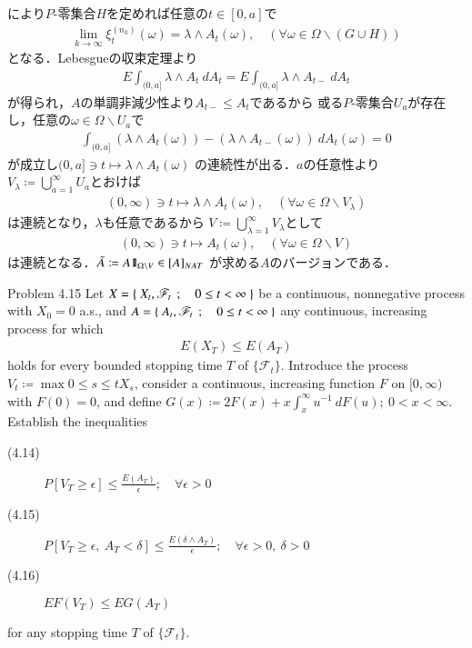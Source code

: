 \begin{prf}
\begin{description}
				により$P$-零集合$H$を定めれば任意の$t \in [0,a]$で
				\begin{align}
					\lim_{k \to \infty} \xi^{(n_k)}_t(\omega) = \lambda \wedge A_t(\omega),
					\quad (\forall \omega \in \Omega \backslash (G \cup H))
				\end{align}
				となる．Lebesgueの収束定理より
				\begin{align}
					E\int_{(0,a]} \lambda \wedge A_t\ dA_t
					= E\int_{(0,a]} \lambda \wedge A_{t-}\ dA_t
				\end{align}
				が得られ，$A$の単調非減少性より$A_{t-} \leq A_t$であるから
				或る$P$-零集合$U_a$が存在し，任意の$\omega \in \Omega \backslash U_a$で
				\begin{align}
					\int_{(0,a]} (\lambda \wedge A_t(\omega)) 
					- (\lambda \wedge A_{t-}(\omega))\ dA_t(\omega) = 0
				\end{align}
				が成立し$(0,a] \ni t \longmapsto \lambda \wedge A_t(\omega)$
				の連続性が出る．$a$の任意性より
				$V_\lambda \coloneqq \bigcup_{a=1}^\infty U_a$とおけば
				\begin{align}
					(0,\infty) \ni t \longmapsto \lambda \wedge A_t(\omega),
					 \quad (\forall \omega \in \Omega \backslash V_\lambda)
				\end{align}
				は連続となり，$\lambda$も任意であるから
				$V \coloneqq \bigcup_{\lambda=1}^\infty V_\lambda$として
				\begin{align}
					(0,\infty) \ni t \longmapsto A_t(\omega),
					\quad (\forall \omega \in \Omega \backslash V)
				\end{align}
				は連続となる．$\tilde{A} \coloneqq A \mbox{1}\hspace{-0.25em}\mbox{l}_{\Omega \backslash V} \in [A]_{NAT}$
				が求める$A$のバージョンである．
				\QED
		\end{description}
	\end{prf}
	
	\begin{itembox}[l]{Problem 4.15}
		Let $X = \left\{\ X_t,\mathscr{F}_t\ \, ; \quad 0 \leq t < \infty\ \right\}$ be a continuous, nonnegative process
		with $X_0 = 0$ a.s., and $A = \left\{\ A_t,\mathscr{F}_t\ \, ; \quad 0 \leq t < \infty\ \right\}$ any continuous,
		increasing process for which
		\begin{align}
			E(X_T) \leq E(A_T)
		\end{align}
		holds for every bounded stopping time $T$ of $\{\mathscr{F}_t\}$. Introduce the process
		$V_t \coloneqq \max{0 \leq s \leq t}{X_s}$, consider a continuous, increasing function $F$
		on $[0,\infty)$ with $F(0) = 0$, and define $G(x) \coloneqq 2F(x) + x\int_{x}^\infty u^{-1}\ dF(u);
		\ 0 < x < \infty$. Establish the inequalities
		\begin{description}
			\item[(4.14)] $\displaystyle P[V_T \geq \epsilon] \leq \frac{E(A_T)}{\epsilon};\quad \forall \epsilon > 0$
			\item[(4.15)] $\displaystyle P[V_T \geq \epsilon,\ A_T < \delta] \leq \frac{E(\delta \wedge A_T)}{\epsilon};\quad \forall \epsilon > 0,\ \delta > 0$
			\item[(4.16)] $EF(V_T) \leq EG(A_T)$
		\end{description}
		for any stopping time $T$ of $\{\mathscr{F}_t\}$.
	\end{itembox}
